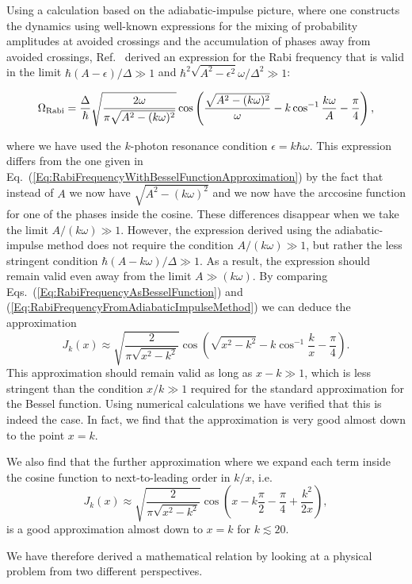 \documentclass[aps,twocolumn,superscriptaddress]{revtex4}
\begin{document}
Using a calculation based on the adiabatic-impulse picture, where one constructs the dynamics using well-known expressions for the mixing of probability amplitudes at avoided crossings and the accumulation of phases away from avoided crossings, Ref.~\cite{Ashhab2007} derived an expression for the Rabi frequency that is valid in the limit $\hbar(A-\epsilon)/\Delta\gg 1$ and $\hbar^2\sqrt{A^2-\epsilon^2}\omega/\Delta^2\gg 1$:
%
\begin{widetext}
\begin{equation}
\Omega_{\rm Rabi} = \frac{\Delta}{\hbar} \sqrt{\frac{2\omega}{\pi \sqrt{A^2-(k\omega)^2}}} \cos \left( \frac{\sqrt{A^2-(k\omega)^2}}{\omega} - k \cos^{-1}\frac{k\omega}{A} - \frac{\pi}{4}\right),
%
\label{Eq:RabiFrequencyFromAdiabaticImpulseMethod}
\end{equation}
\end{widetext}
%
where we have used the $k$-photon resonance condition $\epsilon=k\hbar\omega$. This expression differs from the one given in Eq.~(\ref{Eq:RabiFrequencyWithBesselFunctionApproximation}) by the fact that instead of $A$ we now have $\sqrt{A^2-(k\omega)^2}$ and we now have the arccosine function for one of the phases inside the cosine. These differences disappear when we take the limit $A/(k\omega)\gg 1$. However, the expression derived using the adiabatic-impulse method does not require the condition $A/(k\omega)\gg 1$, but rather the less stringent condition $\hbar(A-k\omega)/\Delta\gg 1$. As a result, the expression should remain valid even away from the limit $A\gg(k\omega)$. By comparing Eqs.~(\ref{Eq:RabiFrequencyAsBesselFunction}) and (\ref{Eq:RabiFrequencyFromAdiabaticImpulseMethod}) we can deduce the approximation
%
\begin{equation}
J_k(x) \approx \sqrt{\frac{2}{\pi \sqrt{x^2-k^2}}} \cos \left( \sqrt{x^2-k^2} - k \cos^{-1}\frac{k}{x} - \frac{\pi}{4} \right).
\end{equation}
%
This approximation should remain valid as long as $x-k\gg 1$, which is less stringent than the condition $x/k\gg 1$ required for the standard approximation for the Bessel function. Using numerical calculations we have verified that this is indeed the case. In fact, we find that the approximation is very good almost down to the point $x=k$.

We also find that the further approximation where we expand each term inside the cosine function to next-to-leading order in $k/x$, i.e.
%
\begin{equation}
J_k(x) \approx \sqrt{\frac{2}{\pi \sqrt{x^2-k^2}}} \cos \left( x - k \frac{\pi}{2} - \frac{\pi}{4} + \frac{k^2}{2x} \right),
\end{equation}
%
is a good approximation almost down to $x=k$ for $k\lesssim 20$.

We have therefore derived a mathematical relation by looking at a physical problem from two different perspectives.
\end{document}
